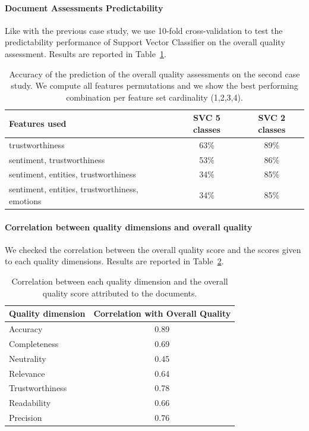 \documentclass{llncs}
\begin{document}
\paragraph{Document Assessments Predictability} Like with the previous case study, we use 10-fold cross-validation to test the predictability performance of Support Vector Classifier on the overall quality assessment. 
Results are reported in Table~\ref{tab:predm}.
\begin{table}
\centering
\caption{Accuracy of the prediction of the overall quality assessments on the second case study. We compute all features permutations and we show the best performing combination per feature set cardinality (1,2,3,4).\label{tab:predm}}
\begin{tabular}{|l|c|c|}
\hline
{\bf Features used} & {\bf SVC 5 classes} & {\bf SVC 2 classes} \\ \hline
trustworthiness & 63\% & 89\% \\ \hline
sentiment, trustworthiness & 53\% & 86\% \\ \hline
sentiment, entities, trustworthiness & 34\% & 85\% \\ \hline
sentiment, entities, trustworthiness, emotions & 34\% & 85\% \\ \hline
\end{tabular}
\end{table}

\paragraph{Correlation between quality dimensions and overall quality}

We checked the correlation between the overall quality score and the scores given to each quality dimensions. Results are reported in Table~\ref{tab:corrm}.
\begin{table}
\centering
\caption{Correlation between each quality dimension and the overall quality score attributed to the documents.\label{tab:corrm}}
\begin{tabular}{|l|c|}
\hline
{\bf Quality dimension} & {\bf Correlation with Overall Quality} \\
\hline
Accuracy         &      0.89\\ \hline
Completeness     &      0.69\\ \hline  
Neutrality       &      0.45\\ \hline  
Relevance        &      0.64\\ \hline  
Trustworthiness  &      0.78\\ \hline  
Readability      &      0.66\\ \hline 
Precision        &      0.76\\ \hline 
\end{tabular}

\end{table}
\end{document}
